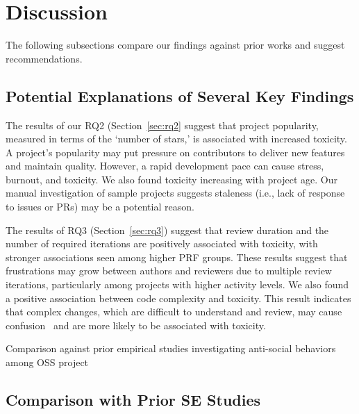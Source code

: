 \section{Discussion}
\label{sec:discussion}
The following subsections compare our findings against prior works and suggest recommendations.

\subsection{Potential Explanations of Several  Key Findings}
The results of our RQ2 (Section~\ref{sec:rq2} suggest that project popularity, measured in terms of the `number of stars,' is associated with increased toxicity. A project's popularity may put pressure on contributors to deliver new features and maintain quality. However, a rapid development pace can cause stress, burnout, and toxicity. We also found toxicity increasing with project age. Our manual investigation of sample projects suggests staleness (i.e., lack of response to issues or PRs) may be a potential reason.

The results of RQ3 (Section~\ref{sec:rq3}) suggest that review duration and the number of required iterations are positively associated with toxicity, with stronger associations seen among higher PRF groups. {These results suggest that frustrations may grow between authors and reviewers due to multiple review iterations, particularly among projects with higher activity levels.}
We also found a positive association between code complexity and toxicity. {This result indicates that complex changes, which are difficult to understand and review, may cause confusion~\cite{ebert2019confusion} and are more likely to be associated with toxicity.}



\begin{table*}
    
    \caption{Comparison against prior empirical studies investigating anti-social behaviors among OSS project}
    \label{tab:comparison}
    \centering   

\end{table*}

\subsection{Comparison with  Prior SE Studies} 

